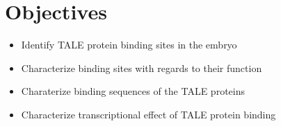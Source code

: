 \chapter{Objectives}
\label{chp:discussion}

\begin{itemize}

  \item Identify TALE protein binding sites in the embryo 
  
  \item Characterize binding sites with regards to their function
  
  \item Charaterize binding sequences of the TALE proteins
  
  \item Characterize transcriptional effect of TALE protein binding
  
\end{itemize}